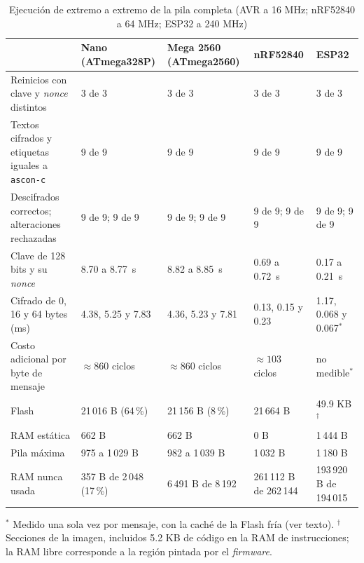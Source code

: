\begin{table}[H]
\centering
\caption{Ejecución de extremo a extremo de la pila completa (AVR a 16 MHz; nRF52840 a 64 MHz; ESP32 a 240 MHz)}
\label{tab:res_e2e}
\footnotesize
\begin{tabularx}{\textwidth}{@{}>{\raggedright\arraybackslash}XL{0.165\textwidth}L{0.165\textwidth}L{0.165\textwidth}L{0.165\textwidth}@{}}
\toprule
& \textbf{Nano (ATmega328P)} & \textbf{Mega 2560 (ATmega2560)} & \textbf{nRF52840} & \textbf{ESP32} \\
\midrule
Reinicios con clave y \textit{nonce} distintos & 3 de 3 & 3 de 3 & 3 de 3 & 3 de 3 \\
Textos cifrados y etiquetas iguales a \texttt{ascon-c} & 9 de 9 & 9 de 9 & 9 de 9 & 9 de 9 \\
Descifrados correctos; alteraciones rechazadas & 9 de 9; 9 de 9 & 9 de 9; 9 de 9 & 9 de 9; 9 de 9 & 9 de 9; 9 de 9 \\
Clave de 128 bits y su \textit{nonce} & 8.70 a 8.77~s & 8.82 a 8.85~s & 0.69 a 0.72~s & 0.17 a 0.21~s \\
Cifrado de 0, 16 y 64 bytes (ms) & 4.38, 5.25 y 7.83 & 4.36, 5.23 y 7.81 & 0.13, 0.15 y 0.23 & 1.17, 0.068 y 0.067$^{*}$ \\
Costo adicional por byte de mensaje & $\approx 860$ ciclos & $\approx 860$ ciclos & $\approx 103$ ciclos & no medible$^{*}$ \\
Flash & 21\,016 B (64\,\%) & 21\,156 B (8\,\%) & 21\,664 B & 49.9 KB$^{\dagger}$ \\
RAM estática & 662 B & 662 B & 0 B & 1\,444 B \\
Pila máxima & 975 a 1\,029 B & 982 a 1\,039 B & 1\,032 B & 1\,180 B \\
RAM nunca usada & 357 B de 2\,048 (17\,\%) & 6\,491 B de 8\,192 & 261\,112 B de 262\,144 & 193\,920 B de 194\,015 \\
\bottomrule
\end{tabularx}

\vspace{2pt}
{\footnotesize\raggedright $^{*}$ Medido una sola vez por mensaje, con la caché de la Flash fría (ver texto). $^{\dagger}$ Secciones de la imagen, incluidos 5.2 KB de código en la RAM de instrucciones; la RAM libre corresponde a la región pintada por el \textit{firmware}.\par}
\end{table}

